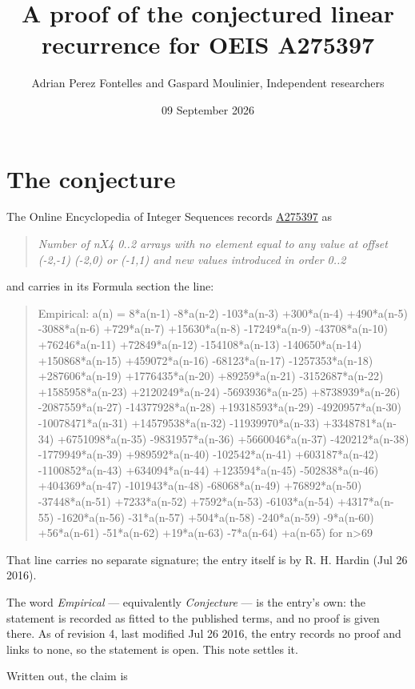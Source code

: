 \documentclass[11pt]{article}
\title{A proof of the conjectured linear recurrence for OEIS A275397}
\author{Adrian Perez Fontelles and Gaspard Moulinier, Independent researchers}
\date{09 September 2026}
\theoremstyle{definition}
\begin{document}
\maketitle
\section{The conjecture}

The Online Encyclopedia of Integer Sequences records \href{https://oeis.org/A275397}{A275397} as

\begin{quote}\itshape Number of nX4 0..2 arrays with no element equal to any value at offset (-2,-1) (-2,0) or (-1,1) and new values introduced in order 0..2\end{quote}

and carries in its Formula section the line:

\begin{quote}\ttfamily Empirical: a(n) = 8*a(n-1) -8*a(n-2) -103*a(n-3) +300*a(n-4) +490*a(n-5) -3088*a(n-6) +729*a(n-7) +15630*a(n-8) -17249*a(n-9) -43708*a(n-10) +76246*a(n-11) +72849*a(n-12) -154108*a(n-13) -140650*a(n-14) +150868*a(n-15) +459072*a(n-16) -68123*a(n-17) -1257353*a(n-18) +287606*a(n-19) +1776435*a(n-20) +89259*a(n-21) -3152687*a(n-22) +1585958*a(n-23) +2120249*a(n-24) -5693936*a(n-25) +8738939*a(n-26) -2087559*a(n-27) -14377928*a(n-28) +19318593*a(n-29) -4920957*a(n-30) -10078471*a(n-31) +14579538*a(n-32) -11939970*a(n-33) +3348781*a(n-34) +6751098*a(n-35) -9831957*a(n-36) +5660046*a(n-37) -420212*a(n-38) -1779949*a(n-39) +989592*a(n-40) -102542*a(n-41) +603187*a(n-42) -1100852*a(n-43) +634094*a(n-44) +123594*a(n-45) -502838*a(n-46) +404369*a(n-47) -101943*a(n-48) -68068*a(n-49) +76892*a(n-50) -37448*a(n-51) +7233*a(n-52) +7592*a(n-53) -6103*a(n-54) +4317*a(n-55) -1620*a(n-56) -31*a(n-57) +504*a(n-58) -240*a(n-59) -9*a(n-60) +56*a(n-61) -51*a(n-62) +19*a(n-63) -7*a(n-64) +a(n-65) for n>69\end{quote}

That line carries no separate signature; the entry itself is by R. H. Hardin (Jul 26 2016).

The word {\itshape Empirical} --- equivalently {\itshape Conjecture} --- is the entry's own: the statement is recorded as fitted to the published terms, and no proof is given there. As of revision 4, last modified Jul 26 2016, the entry records no proof and links to none, so the statement is open. This note settles it.

Written out, the claim is
\end{document}
